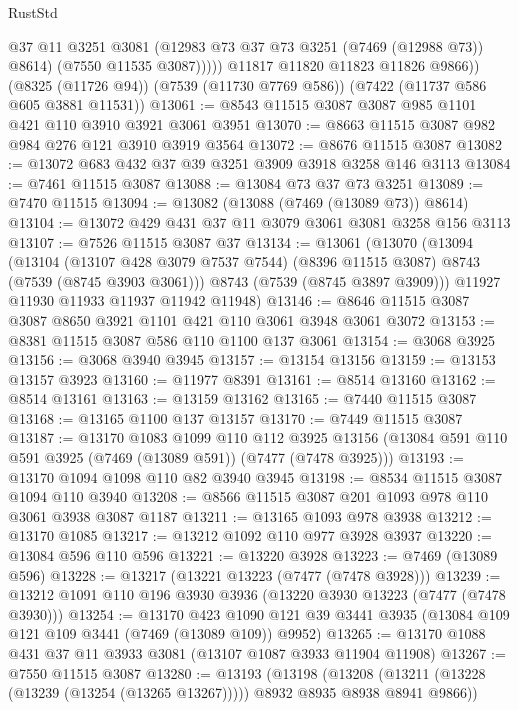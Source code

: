\begin{lexlean}{RustStd}
\begin{coremodule}
                @37
                @11
                @3251
                @3081
                (@12983 @73 @37 @73 @3251 (@7469 (@12988 @73)) @8614)
                (@7550 @11535 @3087)))))
        @11817
        @11820
        @11823
        @11826
        @9866))
    (@8325 (@11726 @94))
    (@7539 (@11730 @7769 @586))
    (@7422 (@11737 @586 @605 @3881 @11531))
@13061 := @8543 @11515 @3087 @3087 @985 @1101 @421 @110 @3910 @3921 @3061 @3951
@13070 := @8663 @11515 @3087 @982 @984 @276 @121 @3910 @3919 @3564
@13072 := @8676 @11515 @3087
@13082 := @13072 @683 @432 @37 @39 @3251 @3909 @3918 @3258 @146 @3113
@13084 := @7461 @11515 @3087
@13088 := @13084 @73 @37 @73 @3251
@13089 := @7470 @11515
@13094 := @13082 (@13088 (@7469 (@13089 @73)) @8614)
@13104 := @13072 @429 @431 @37 @11 @3079 @3061 @3081 @3258 @156 @3113
@13107 := @7526 @11515 @3087 @37
@13134 := @13061
    (@13070
      (@13094
        (@13104
          (@13107 @428 @3079 @7537 @7544)
          (@8396 @11515 @3087)
          @8743
          (@7539 (@8745 @3903 @3061)))
        @8743
        (@7539 (@8745 @3897 @3909)))
      @11927
      @11930
      @11933
      @11937
      @11942
      @11948)
@13146 := @8646 @11515 @3087 @3087 @8650 @3921 @1101 @421 @110 @3061 @3948 @3061 @3072
@13153 := @8381 @11515 @3087 @586 @110 @1100 @137 @3061
@13154 := @3068 @3925
@13156 := @3068 @3940 @3945
@13157 := @13154 @13156
@13159 := @13153 @13157 @3923
@13160 := @11977 @8391
@13161 := @8514 @13160
@13162 := @8514 @13161
@13163 := @13159 @13162
@13165 := @7440 @11515 @3087
@13168 := @13165 @1100 @137 @13157
@13170 := @7449 @11515 @3087
@13187 := @13170
    @1083
    @1099
    @110
    @112
    @3925
    @13156
    (@13084 @591 @110 @591 @3925 (@7469 (@13089 @591)) (@7477 (@7478 @3925)))
@13193 := @13170 @1094 @1098 @110 @82 @3940 @3945
@13198 := @8534 @11515 @3087 @1094 @110 @3940
@13208 := @8566 @11515 @3087 @201 @1093 @978 @110 @3061 @3938 @3087 @1187
@13211 := @13165 @1093 @978 @3938
@13212 := @13170 @1085
@13217 := @13212 @1092 @110 @977 @3928 @3937
@13220 := @13084 @596 @110 @596
@13221 := @13220 @3928
@13223 := @7469 (@13089 @596)
@13228 := @13217 (@13221 @13223 (@7477 (@7478 @3928)))
@13239 := @13212 @1091 @110 @196 @3930 @3936 (@13220 @3930 @13223 (@7477 (@7478 @3930)))
@13254 := @13170
    @423
    @1090
    @121
    @39
    @3441
    @3935
    (@13084 @109 @121 @109 @3441 (@7469 (@13089 @109)) @9952)
@13265 := @13170 @1088 @431 @37 @11 @3933 @3081 (@13107 @1087 @3933 @11904 @11908)
@13267 := @7550 @11515 @3087
@13280 := @13193
    (@13198
      (@13208 (@13211 (@13228 (@13239 (@13254 (@13265 @13267))))) @8932 @8935 @8938 @8941 @9866))

\end{coremodule}
\end{lexlean}
